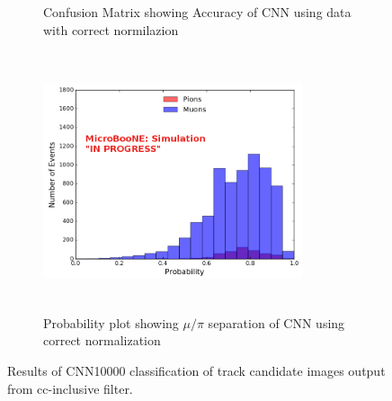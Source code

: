 \begin{figure}[htp!]
\begin{subfigure}[b]{.45\textwidth}
	\caption{Confusion Matrix showing Accuracy of CNN using data with correct normilazion}
	\label{fig:confusion_rightnorm}
	\end{subfigure}
	\quad
	\begin{subfigure}[b]{.45\textwidth}
	\includegraphics[width=3in,height=3in]{figs/prob_0706_rightnorm_sel1.png}
	\caption{Probability plot showing $\mu/\pi$ separation of CNN using correct normalization}
	\label{fig:prob_rightnorm}
	\end{subfigure}
	\quad
\caption{Results of CNN10000 classification of track candidate images output from cc-inclusive filter.}
\label{fig:CNN_ccnc}
\end{figure}

